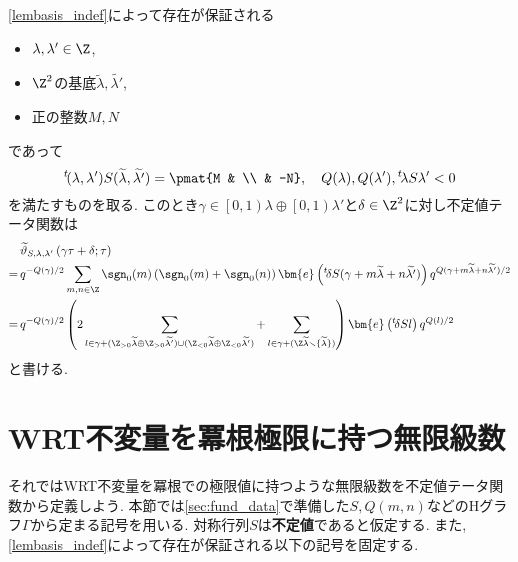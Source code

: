 \documentclass[11pt,b5paper,oneside,lualatex]{ltjsarticle} %
\numberwithin{equation}{section} %
\begin{document}
\begin{rem} \label{rem:indef_false_lim}
	\cref{lembasis_indef}によって存在が保証される
	\begin{itemize}
		\item $ \lambda, \lambda' \in \Z $,
		\item $ \Z^2 $の基底$ \widetilde{\lambda}, \widetilde{\lambda'} $,
		\item 正の整数$ M, N $
	\end{itemize}
	であって
	\[
	{}^t\!(\lambda, \lambda') S (\widetilde{\lambda}, \widetilde{\lambda'}) = \pmat{M & \\ & -N}, \quad
	Q(\lambda), Q(\lambda'), {}^t\!\lambda S \lambda' < 0
	\]
	を満たすものを取る. 
	このとき$ \gamma \in \left[ 0, 1\right) \lambda \oplus \left[ 0, 1\right) \lambda' $と$ \delta \in \Z^2 $に対し不定値テータ関数は
	\begin{align}
		&\widetilde{\vartheta}_{S, \lambda, \lambda'} \left( \gamma \tau + \delta; \tau \right)
		\\
		= \,
		&q^{-Q(\gamma)/2}
		\sum_{m, n \in \Z} \sgn_0(m) \left( \sgn_0(m) + \sgn_0(n) \right) 
		\bm{e} \left( {}^t\!\delta S (\gamma + m\widetilde{\lambda} + n\widetilde{\lambda'}) \right)
		q^{Q(\gamma + m\widetilde{\lambda} + n\widetilde{\lambda'})/2}
		\\
		= \,
		&q^{-Q(\gamma)/2}
		\left(
		2 \sum_{l \in \gamma + (\Z_{> 0} \widetilde{\lambda} \oplus \Z_{> 0} \widetilde{\lambda'}) \cup (\Z_{< 0} \widetilde{\lambda} \oplus \Z_{< 0} \widetilde{\lambda'})}
		+
		\sum_{l \in \gamma + (\Z \widetilde{\lambda} \smallsetminus \{ \widetilde{\lambda} \} )}
		\right)
		\bm{e} \left( {}^t\!\delta S l \right)
		q^{Q(l)/2}
	\end{align}
	と書ける. 
\end{rem}


\section{WRT不変量を冪根極限に持つ無限級数} \label{sec:infinite_series}


それではWRT不変量を冪根での極限値に持つような無限級数を不定値テータ関数から定義しよう. 
本節では\cref{sec:fund_data}で準備した$ S, Q(m, n) $などのHグラフ$ \Gamma $から定まる記号を用いる. 
対称行列$ S $は\textbf{不定値}であると仮定する. 
また, \cref{lembasis_indef}によって存在が保証される以下の記号を固定する. 
\end{document}
